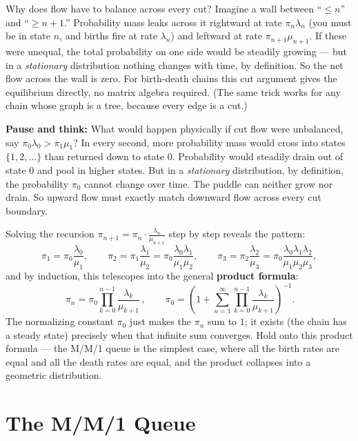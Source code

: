 \begin{whybox}
Why does flow have to balance across every cut? Imagine a wall between ``$\le n$'' and ``$\ge n+1$.''
Probability mass leaks across it rightward at rate $\pi_n \lambda_n$ (you must be in state $n$, and
births fire at rate $\lambda_n$) and leftward at rate $\pi_{n+1}\mu_{n+1}$. If these were unequal,
the total probability on one side would be steadily growing --- but in a \emph{stationary}
distribution nothing changes with time, by definition. So the net flow across the wall is zero. For
birth-death chains this cut argument gives the equilibrium directly, no matrix algebra required. (The
same trick works for any chain whose graph is a tree, because every edge is a cut.)
\end{whybox}

\begin{recoverybox}
\textbf{Pause and think:} What would happen physically if cut flow were unbalanced, say
$\pi_0 \lambda_0 > \pi_1 \mu_1$? In every second, more probability mass would cross into states
$\{1, 2, \dots\}$ than returned down to state $0$. Probability would steadily drain out of state $0$
and pool in higher states. But in a \emph{stationary} distribution, by definition, the probability
$\pi_0$ cannot change over time. The puddle can neither grow nor drain. So upward flow must exactly
match downward flow across every cut boundary.
\end{recoverybox}

Solving the recursion $\pi_{n+1} = \pi_n \cdot \frac{\lambda_n}{\mu_{n+1}}$ step by step reveals the pattern:
\[
  \pi_1 = \pi_0 \frac{\lambda_0}{\mu_1}, \qquad
  \pi_2 = \pi_1 \frac{\lambda_1}{\mu_2} = \pi_0 \frac{\lambda_0 \lambda_1}{\mu_1 \mu_2}, \qquad
  \pi_3 = \pi_2 \frac{\lambda_2}{\mu_3} = \pi_0 \frac{\lambda_0 \lambda_1 \lambda_2}{\mu_1 \mu_2 \mu_3},
\]
and by induction, this telescopes into the general \textbf{product formula}:
\[
  \boxed{\,\pi_n = \pi_0 \prod_{k=0}^{n-1} \frac{\lambda_k}{\mu_{k+1}}\,,}
  \qquad
  \pi_0 = \left(1 + \sum_{n=1}^{\infty} \prod_{k=0}^{n-1}\frac{\lambda_k}{\mu_{k+1}}\right)^{-1}.
\]
The normalizing constant $\pi_0$ just makes the $\pi_n$ sum to $1$; it exists (the chain has a steady
state) precisely when that infinite sum converges. Hold onto this product formula --- the M/M/1
queue is the simplest case, where all the birth rates are equal and all the death rates are equal,
and the product collapses into a geometric distribution.

\section{The M/M/1 Queue}
\label{ch27:mm1}

